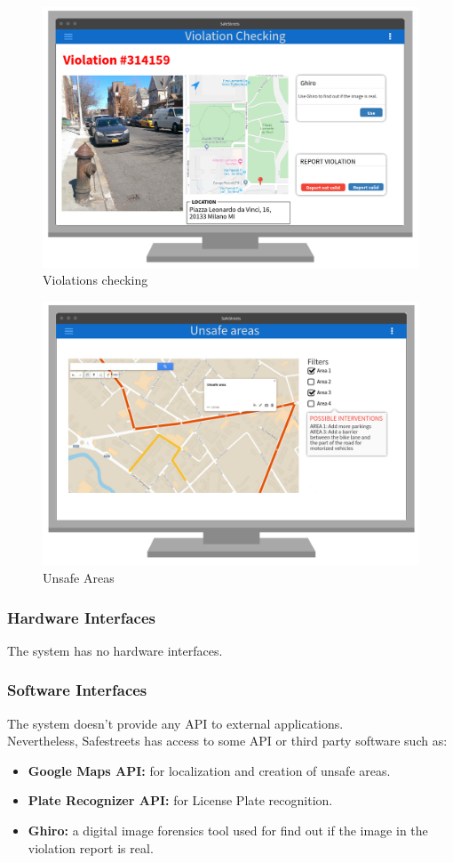 \documentclass{article}
\begin{document}
\begin{figure}[H]
    \centering
    \includegraphics[scale=0.35]{Images/WEBViolationChecking}
    \caption{Violations checking}
\end{figure}
\begin{figure}[H]
    \centering
    \includegraphics[scale=0.35]{Images/WEBUnsafeAreas}
    \caption{Unsafe Areas}
\end{figure}
\newpage
\newpage
\subsubsection{Hardware Interfaces}
The system has no hardware interfaces.
\subsubsection{Software Interfaces}
The system doesn't provide any API to external applications.\\
Nevertheless, Safestreets has access to some API or third party software such as:
\begin{itemize}
    \item \textbf{Google Maps API:} for localization and creation of unsafe areas.
    \item \textbf{Plate Recognizer API:} for License Plate recognition.
    \item \textbf{Ghiro:} a digital image forensics tool used for find out if the image
    in the violation report is real.
\end{itemize}
\end{document}
